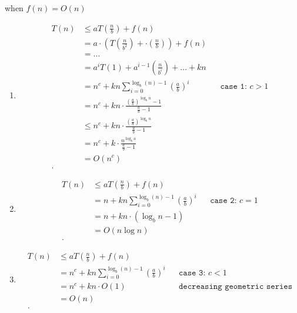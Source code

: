 \documentclass[../../main/main.tex]{subfiles}
\begin{document}
when $f(n) = O(n)$
\begin{enumerate}
  \item 
    \begin{align*}
      T(n) &\le  aT(\frac{n}{b}) + f(n)\\
           &= a \cdot (T(\frac{n}{b^2})+ \cdot (\frac{n}{b})) + f(n) \\
           &=  \ldots \\
           &= a^{i}T(1) + a^{i-1} (\frac{n}{b^{i}}) + \ldots + kn\\
           &=  n^{c} + kn\sum^{\log_b(n)-1}_{i=0}(\frac{a}{b})^{i} && \texttt{case 1: $c > 1$} \\
           &= n^{c} + kn \cdot  \frac{(\frac{a}{b})^{\log_bn} - 1}{\frac{a}{b}-1} \\
           &\le n^{c} + kn \cdot  \frac{(\frac{a}{b})^{\log_bn} }{\frac{a}{b}-1} \\
           &=  n^{c} + k\cdot \frac{n^{\log_ba}}{\frac{a}{b}-1} \\
           &=  O(n^{c}) \\
    .\end{align*}
  \item 
\begin{align*} 
      T(n) &\le  aT(\frac{n}{b}) + f(n)\\
           &=  n + kn\sum^{\log_b(n)-1}_{i=0}(\frac{a}{b})^{i} && \texttt{case 2: $c = 1$} \\
           &=  n + kn \cdot (\log_bn -1) \\
           &=  O(n\log n)\\
.\end{align*}
\item
  \begin{align*}
       T(n) &\le  aT(\frac{n}{b}) + f(n)\\
           &=  n^{c} + kn\sum^{\log_b(n)-1}_{i=0}(\frac{a}{b})^{i} && \texttt{case 3: $c < 1$} \\
           &=  n^{c} + kn\cdot O(1)&&\texttt{decreasing geometric series} \\
           &= O(n) \\
  .\end{align*}
\end{enumerate}
\end{document}
